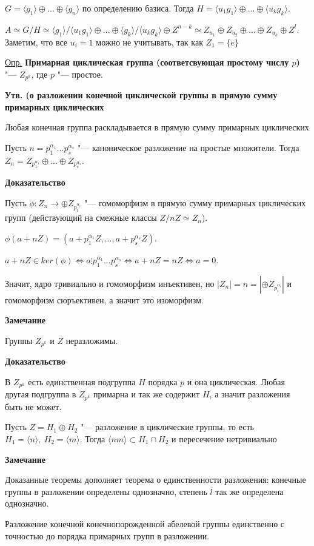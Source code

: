 \documentclass{article}
\begin{document}
$G = \langle g_1 \rangle \oplus ... \oplus \langle g_n \rangle$ по определению базиса. Тогда $H = \langle u_1g_1 \rangle \oplus ... \oplus \langle u_kg_k \rangle$.

$A \simeq G / H \simeq \langle g_1 \rangle / \langle u_1g_1 \rangle \oplus ... \oplus \langle g_k \rangle / \langle u_kg_k \rangle \oplus Z^{n-k} \simeq Z_{u_1} \oplus Z_{u_2} \oplus ...  \oplus Z_{u_k} \oplus Z^l$. Заметим, что все $u_i = 1$ можно не учитывать, так как $Z_1 = \{e\}$

\vspace{10pt}

\underline{Опр.} \textbf{Примарная циклическая группа (соответсвующая простому числу $p$)} "--- $Z_{p^k}$, где $p$ "--- простое.

\vspace{5pt}

\textbf{Утв. (о разложении конечной циклической группы в прямую сумму примарных циклических}

Любая конечная группа раскладывается в прямую сумму примарных циклических

Пусть $n = p_1^{\alpha_1}...p_s^{\alpha_s}$ "--- каноническое разложение на простые множители.
Тогда $Z_n = Z_{p_1^{\alpha_1}} \oplus ... \oplus Z_{p_s^{\alpha_s}}$. 

\textbf{Доказательство}

Пусть $\phi: Z_n \rightarrow \oplus Z_{p_i^{\alpha_i}}$ "--- гомоморфизм в прямую сумму примарных циклических групп (действующий на смежные классы $Z / nZ \simeq Z_n$).

$\phi(a + nZ) = (a + p_1^{\alpha_1}Z, ..., a + p_s^{\alpha_s}Z)$. 

$a + nZ \in ker(\phi) \Leftrightarrow a \vdots p_1^{\alpha_1}...p_s^{\alpha_s} \Leftrightarrow a + nZ = nZ \Leftrightarrow a = 0$.

Значит, ядро тривиально и гомоморфизм инъективен, но $|Z_n| = n = |\oplus Z_{p_i^{\alpha_i}}|$ и гомоморфизм сюръективен, а значит это изоморфизм.

\vspace{10pt}

\textbf{Замечание}

Группы $Z_{p^k}$ и $Z$ неразложимы.

\textbf{Доказательство}

В $Z_{p^k}$ есть единственная подгруппа $H$ порядка $p$ и она циклическая. Любая другая подгруппа в $Z_{p^k}$ примарна и так же содержит $H$, а значит разложения быть не может.

Пусть $Z = H_1 \oplus H_2$ "--- разложение в циклические группы, то есть $H_1 = \langle n \rangle, \ H_2 = \langle m \rangle$. Тогда $\langle nm \rangle \subset H_1 \cap H_2$ и пересечение нетривиально

\vspace{5pt}

\textbf{Замечание}

Доказанные теоремы дополняет теорема о единственности разложения: конечные группы в разложении определены однозначно, степень $l$ так же определена однозначно.

Разложение конечной конечнопорожденной абелевой группы единственно с точностью до порядка примарных групп в разложении.
\end{document}
